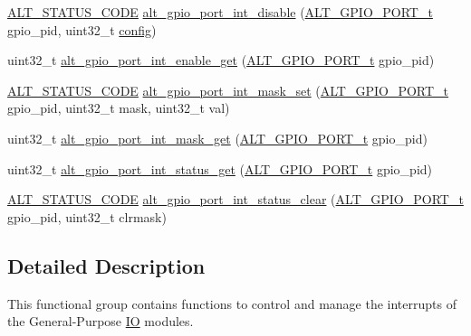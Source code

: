 \begin{DoxyCompactItemize}
\item 
\mbox{\hyperlink{hwlib_8h_abdb0d369f069723ca55d6c94bcaaaa12}{A\+L\+T\+\_\+\+S\+T\+A\+T\+U\+S\+\_\+\+C\+O\+DE}} \mbox{\hyperlink{group__ALT__GPIO__INT_gabbd80365343c40e1044a75796badea1e}{alt\+\_\+gpio\+\_\+port\+\_\+int\+\_\+disable}} (\mbox{\hyperlink{group__ALT__GPIO__API__CONFIG_gaaf1cf0e2a720d20cd883810f2b59097e}{A\+L\+T\+\_\+\+G\+P\+I\+O\+\_\+\+P\+O\+R\+T\+\_\+t}} gpio\+\_\+pid, uint32\+\_\+t \mbox{\hyperlink{structconfig__s}{config}})
\item 
uint32\+\_\+t \mbox{\hyperlink{group__ALT__GPIO__INT_ga67799a7bdd437cec9199142faea4a756}{alt\+\_\+gpio\+\_\+port\+\_\+int\+\_\+enable\+\_\+get}} (\mbox{\hyperlink{group__ALT__GPIO__API__CONFIG_gaaf1cf0e2a720d20cd883810f2b59097e}{A\+L\+T\+\_\+\+G\+P\+I\+O\+\_\+\+P\+O\+R\+T\+\_\+t}} gpio\+\_\+pid)
\item 
\mbox{\hyperlink{hwlib_8h_abdb0d369f069723ca55d6c94bcaaaa12}{A\+L\+T\+\_\+\+S\+T\+A\+T\+U\+S\+\_\+\+C\+O\+DE}} \mbox{\hyperlink{group__ALT__GPIO__INT_ga1badd0295d3246014e8f4f36ad2fcf8b}{alt\+\_\+gpio\+\_\+port\+\_\+int\+\_\+mask\+\_\+set}} (\mbox{\hyperlink{group__ALT__GPIO__API__CONFIG_gaaf1cf0e2a720d20cd883810f2b59097e}{A\+L\+T\+\_\+\+G\+P\+I\+O\+\_\+\+P\+O\+R\+T\+\_\+t}} gpio\+\_\+pid, uint32\+\_\+t mask, uint32\+\_\+t val)
\item 
uint32\+\_\+t \mbox{\hyperlink{group__ALT__GPIO__INT_ga288661ea6e456980652610131cd0ad53}{alt\+\_\+gpio\+\_\+port\+\_\+int\+\_\+mask\+\_\+get}} (\mbox{\hyperlink{group__ALT__GPIO__API__CONFIG_gaaf1cf0e2a720d20cd883810f2b59097e}{A\+L\+T\+\_\+\+G\+P\+I\+O\+\_\+\+P\+O\+R\+T\+\_\+t}} gpio\+\_\+pid)
\item 
uint32\+\_\+t \mbox{\hyperlink{group__ALT__GPIO__INT_gafda3ed77fc6f80ccc98865f45ea3c05f}{alt\+\_\+gpio\+\_\+port\+\_\+int\+\_\+status\+\_\+get}} (\mbox{\hyperlink{group__ALT__GPIO__API__CONFIG_gaaf1cf0e2a720d20cd883810f2b59097e}{A\+L\+T\+\_\+\+G\+P\+I\+O\+\_\+\+P\+O\+R\+T\+\_\+t}} gpio\+\_\+pid)
\item 
\mbox{\hyperlink{hwlib_8h_abdb0d369f069723ca55d6c94bcaaaa12}{A\+L\+T\+\_\+\+S\+T\+A\+T\+U\+S\+\_\+\+C\+O\+DE}} \mbox{\hyperlink{group__ALT__GPIO__INT_ga92d21264409553dffbfbbdde5381abbd}{alt\+\_\+gpio\+\_\+port\+\_\+int\+\_\+status\+\_\+clear}} (\mbox{\hyperlink{group__ALT__GPIO__API__CONFIG_gaaf1cf0e2a720d20cd883810f2b59097e}{A\+L\+T\+\_\+\+G\+P\+I\+O\+\_\+\+P\+O\+R\+T\+\_\+t}} gpio\+\_\+pid, uint32\+\_\+t clrmask)
\end{DoxyCompactItemize}


\subsection{Detailed Description}
This functional group contains functions to control and manage the interrupts of the General-\/\+Purpose \mbox{\hyperlink{structIO}{IO}} modules. 

